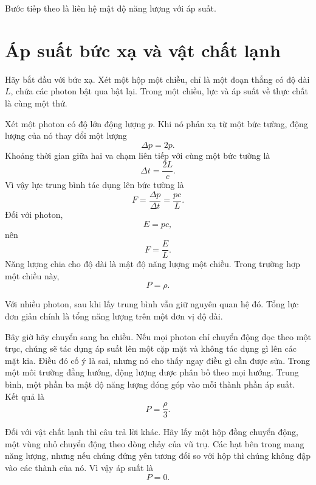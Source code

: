 Bước tiếp theo là liên hệ mật độ năng lượng với áp suất.

\section{Áp suất bức xạ và vật chất lạnh}

Hãy bắt đầu với bức xạ. Xét một hộp một chiều, chỉ là một đoạn thẳng có độ dài \(L\), chứa các photon bật qua bật lại. Trong một chiều, lực và áp suất về thực chất là cùng một thứ.

Xét một photon có độ lớn động lượng \(p\). Khi nó phản xạ từ một bức tường, động lượng của nó thay đổi một lượng
\begin{equation}
\Delta p = 2p.
\end{equation}
Khoảng thời gian giữa hai va chạm liên tiếp với cùng một bức tường là
\begin{equation}
\Delta t = \frac{2L}{c}.
\end{equation}
Vì vậy lực trung bình tác dụng lên bức tường là
\begin{equation}
F=\frac{\Delta p}{\Delta t}=\frac{pc}{L}.
\end{equation}
Đối với photon,
\begin{equation}
E=pc,
\end{equation}
nên
\begin{equation}
F=\frac{E}{L}.
\end{equation}
Năng lượng chia cho độ dài là mật độ năng lượng một chiều. Trong trường hợp một chiều này,
\begin{equation}
P=\rho .
\end{equation}

Với nhiều photon, sau khi lấy trung bình vẫn giữ nguyên quan hệ đó. Tổng lực đơn giản chính là tổng năng lượng trên một đơn vị độ dài.

Bây giờ hãy chuyển sang ba chiều. Nếu mọi photon chỉ chuyển động dọc theo một trục, chúng sẽ tác dụng áp suất lên một cặp mặt và không tác dụng gì lên các mặt kia. Điều đó cố ý là sai, nhưng nó cho thấy ngay điều gì cần được sửa. Trong một môi trường đẳng hướng, động lượng được phân bố theo mọi hướng. Trung bình, một phần ba mật độ năng lượng đóng góp vào mỗi thành phần áp suất. Kết quả là
\begin{equation}
P=\frac{\rho}{3}.
\end{equation}

Đối với vật chất lạnh thì câu trả lời khác. Hãy lấy một hộp đồng chuyển động, một vùng nhỏ chuyển động theo dòng chảy của vũ trụ. Các hạt bên trong mang năng lượng, nhưng nếu chúng đứng yên tương đối so với hộp thì chúng không đập vào các thành của nó. Vì vậy áp suất là
\begin{equation}
P=0.
\end{equation}

